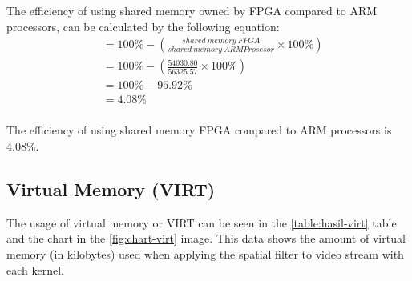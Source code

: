
The efficiency of using shared memory owned by FPGA compared to ARM processors, can be calculated by the following equation:
\begin{equation*}
    \begin{split}
& = 100\% - \left( \frac{shared\ memory\ FPGA}{shared\ memory\ ARM Prosesor} \times 100\% \right) \\
& = 100\% - \left( \frac{54030.80}{56325.57} \times 100\% \right) \\
& = 100\% - 95.92\% \\
& = 4.08\% \\
    \end{split}
\end{equation*}

The efficiency of using shared memory FPGA compared to ARM processors is 4.08\%.


\subsection{Virtual Memory (VIRT)}


The usage of virtual memory or VIRT can be seen in the \ref{table:hasil-virt} table and the chart in the \ref{fig:chart-virt} image. This data shows the amount of virtual memory (in kilobytes) used when applying the spatial filter to video stream with each kernel.

